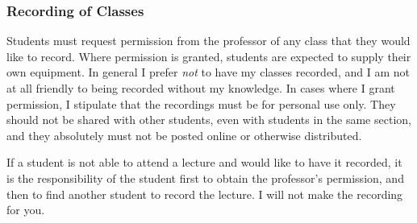 \subsubsection{Recording of Classes}
\label{recording}

Students must request permission from the professor of any class that they
would like to record. Where permission is granted, students are expected to
supply their own equipment. In general I prefer \emph{not} to have my classes
recorded, and I am not at all friendly to being recorded without my knowledge.
In cases where I grant permission, I stipulate that the recordings must be for
personal use only. They should not be shared with other students, even with
students in the same section, and they absolutely must not be posted online or
otherwise distributed.

If a student is not able to attend a lecture and would like to have it recorded,
it is the responsibility of the student first to obtain the professor's
permission, and then to find another student to record the lecture. I will not
make the recording for you.